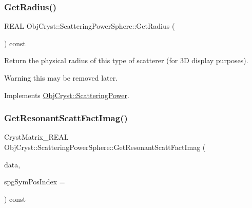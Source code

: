 \mbox{\label{class_obj_cryst_1_1_scattering_power_sphere_a0e4cb0c9f333c38f9b6436c54d52a580}} 
\subsubsection{\texorpdfstring{GetRadius()}{GetRadius()}}
{\footnotesize\ttfamily R\+E\+AL Obj\+Cryst\+::\+Scattering\+Power\+Sphere\+::\+Get\+Radius (\begin{DoxyParamCaption}{ }\end{DoxyParamCaption}) const\hspace{0.3cm}{\ttfamily [virtual]}}

Return the physical radius of this type of scatterer (for 3D display purposes). \begin{DoxyWarning}{Warning}
this may be removed later. 
\end{DoxyWarning}


Implements \mbox{\hyperlink{class_obj_cryst_1_1_scattering_power_ac44860aca21734844379ddec87622f7b}{Obj\+Cryst\+::\+Scattering\+Power}}.

\mbox{\label{class_obj_cryst_1_1_scattering_power_sphere_a66b0eb24b24b92e6bbdf677c53853aad}} 
\subsubsection{\texorpdfstring{GetResonantScattFactImag()}{GetResonantScattFactImag()}}
{\footnotesize\ttfamily Cryst\+Matrix\+\_\+\+R\+E\+AL Obj\+Cryst\+::\+Scattering\+Power\+Sphere\+::\+Get\+Resonant\+Scatt\+Fact\+Imag (\begin{DoxyParamCaption}\item[{const \mbox{\hyperlink{class_obj_cryst_1_1_scattering_data}{Scattering\+Data}} \&}]{data,  }\item[{const int}]{spg\+Sym\+Pos\+Index = {} }\end{DoxyParamCaption}) const\hspace{0.3cm}{\ttfamily [virtual]}}



